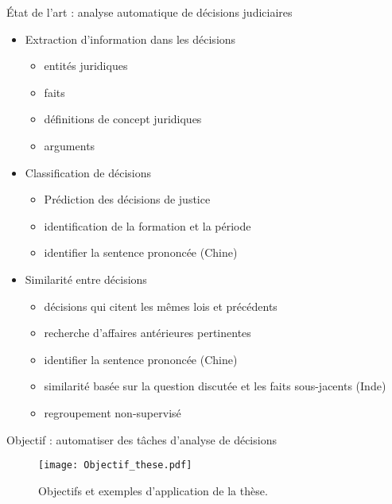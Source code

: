 \begin{frame}[c]{État de l'art : analyse automatique de décisions judiciaires}
	\scriptsize
	\begin{itemize}
		\item Extraction d'information dans les décisions
		\begin{itemize}  \scriptsize
			\item entités juridiques \cite{Waltl2016lexia, andrew2018legalNerAndRelation}
			\item faits \cite{wyner2010extractlegalelts, wyner2010casefactors, Shulayeva2017recognfactprincip}
			\item définitions de concept juridiques \cite{Waltl2016lexia,waltl2017legaliegerman}
			\item arguments \cite{moens2007NBvsMaxent4arguments}
		\end{itemize}
		\item Classification de décisions
		\begin{itemize} \scriptsize
			\item Prédiction des décisions de justice \cite{Ashley2009classifCases, Aletras2016predictDecisionECHR}
			\item identification de la formation et la période \cite{Sulea2017predictareadecision,sulea2017legalEnsSVM}
			\item identifier la sentence prononcée (Chine) \cite{ma2018wmdchinesecase}
		\end{itemize}
		\item Similarité entre décisions 
		\begin{itemize}  \scriptsize
			\item décisions qui citent les mêmes lois et précédents \cite{nair2018judgsimassorule}
			\item recherche d'affaires antérieures pertinentes  \cite{thenmozhi2017legalprecedretriev}
			\item identifier la sentence prononcée (Chine) \cite{ma2018wmdchinesecase}
			\item similarité basée sur la question discutée et les faits sous-jacents (Inde) \cite{kumar2011judgmentsimilarity}
			\item regroupement non-supervisé \cite{raghuveer2012legalclusteringLDA}
		\end{itemize}
	\end{itemize}
\end{frame}

\begin{frame}[c]{Objectif : automatiser des tâches d'analyse de décisions}
		\begin{figure}[!htb]
		\texttt{[image: Objectif\_these.pdf]}
		\caption{Objectifs et exemples d'application de la thèse.} \label{fig:intro:objectif-these}
	\end{figure}

\end{frame}


